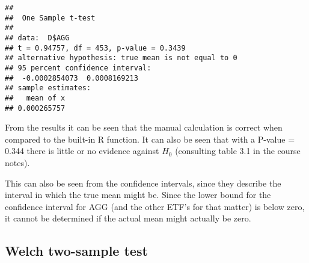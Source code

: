 \documentclass[
]{article}
\newenvironment{Shaded}{\begin{snugshade}}{\end{snugshade}}
\newcommand{\AttributeTok}[1]{\textcolor[rgb]{0.77,0.63,0.00}{#1}}
\newcommand{\CommentTok}[1]{\textcolor[rgb]{0.56,0.35,0.01}{\textit{#1}}}
\newcommand{\DecValTok}[1]{\textcolor[rgb]{0.00,0.00,0.81}{#1}}
\newcommand{\FunctionTok}[1]{\textcolor[rgb]{0.00,0.00,0.00}{#1}}
\newcommand{\NormalTok}[1]{#1}
\newcommand{\SpecialCharTok}[1]{\textcolor[rgb]{0.00,0.00,0.00}{#1}}
\begin{document}
\begin{Shaded}
\end{Shaded}

\begin{verbatim}
## 
##  One Sample t-test
## 
## data:  D$AGG
## t = 0.94757, df = 453, p-value = 0.3439
## alternative hypothesis: true mean is not equal to 0
## 95 percent confidence interval:
##  -0.0002854073  0.0008169213
## sample estimates:
##   mean of x 
## 0.000265757
\end{verbatim}

From the results it can be seen that the manual calculation is correct
when compared to the built-in R function. It can also be seen that with
a P-value = 0.344 there is little or no evidence against \(H_0\)
(consulting table 3.1 in the course notes).

This can also be seen from the confidence intervals, since they describe
the interval in which the true mean might be. Since the lower bound for
the confidence interval for AGG (and the other ETF's for that matter) is
below zero, it cannot be determined if the actual mean might actually be
zero.

\subsection{Welch two-sample test}
\end{document}
